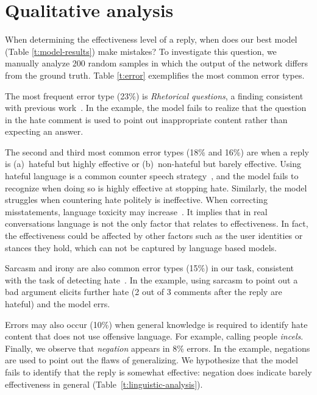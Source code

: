 \documentclass[11pt]{article}
\begin{document}
\section{Qualitative analysis}
\label{s:erroranalysis}

When determining the effectiveness level of a reply,
when does our best model (Table \ref{t:model-results}) make mistakes? 
To investigate this question,
we manually analyze 200 random samples in which the output of the network differs from the ground truth. 
Table \ref{t:error} exemplifies the most common error types.

The most frequent error type (23\%) is \emph{Rhetorical questions},
a finding consistent with previous work~\cite{schmidt-wiegand-2017-survey}. 
In the example,
the model fails to realize that the question in the hate comment is used to point out inappropriate content rather than expecting an answer.

The second and third most common error types (18\% and 16\%)
are when a reply is
(a)~hateful but highly effective
or
(b)~non-hateful but barely effective.
Using hateful language is a common counter speech strategy~\cite{DBLP:conf/icwsm/MathewSTRSMG019},
and the model fails to recognize when doing so is highly effective at stopping hate.
Similarly, the model struggles when countering hate politely is ineffective.
When correcting misstatements, language toxicity may increase~\cite{10.1145/3411764.3445642}.
It implies that in real conversations language is not the only factor that relates to effectiveness. 
In fact, the effectiveness could be affected by other factors such as the user identities or stances they hold, which can not be captured by language based models. 


Sarcasm and irony are also common error types (15\%) in our task,
consistent with the task of detecting hate~\cite{nobata2016abusive,qian-etal-2019-benchmark}.
In the example, using sarcasm to point out a bad argument elicits further hate (2 out of 3 comments after the reply are hateful)
and the model errs.

Errors may also occur (10\%) when general knowledge is required to identify hate content that does not use offensive language.
For example, calling people \emph{incels}.
Finally, we observe that \emph{negation} appears in 8\% errors.
In the example, negations are used to point out the flaws of generalizing.
We hypothesize that the model fails to identify that the reply is somewhat effective: negation does indicate barely effectiveness in general (Table~\ref{t:linguistic-analysis}).
\end{document}
